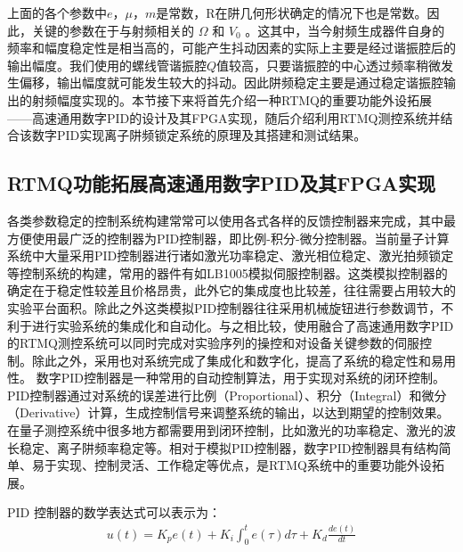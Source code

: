 上面的各个参数中$e$，$\mu$，$m$是常数，R在阱几何形状确定的情况下也是常数。因此，关键的参数在于与射频相关的 $\Omega$ 和 $V_0$ 。这其中，当今射频生成器件自身的频率和幅度稳定性是相当高的，可能产生抖动因素的实际上主要是经过谐振腔后的输出幅度。我们使用的螺线管谐振腔$Q$值较高，只要谐振腔的中心透过频率稍微发生偏移，输出幅度就可能发生较大的抖动。因此阱频稳定主要是通过稳定谐振腔输出的射频幅度实现的。本节接下来将首先介绍一种RTMQ的重要功能外设拓展——高速通用数字PID的设计及其FPGA实现，随后介绍利用RTMQ测控系统并结合该数字PID实现离子阱频锁定系统的原理及其搭建和测试结果。

\subsection[RTMQ功能拓展高速通用数字PID及其FPGA实现]{RTMQ功能拓展高速通用数字PID及其FPGA实现\label{section:digital_pid}}

各类参数稳定的控制系统构建常常可以使用各式各样的反馈控制器来完成，其中最方便使用最广泛的控制器为PID控制器，即比例-积分-微分控制器。当前量子计算系统中大量采用PID控制器进行诸如激光功率稳定、激光相位稳定、激光拍频锁定等控制系统的构建，常用的器件有如LB1005模拟伺服控制器。这类模拟控制器的确定在于稳定性较差且价格昂贵，此外它的集成度也比较差，往往需要占用较大的实验平台面积。除此之外这类模拟PID控制器往往采用机械旋钮进行参数调节，不利于进行实验系统的集成化和自动化。与之相比较，使用融合了高速通用数字PID的RTMQ测控系统可以同时完成对实验序列的操控和对设备关键参数的伺服控制。除此之外，采用也对系统完成了集成化和数字化，提高了系统的稳定性和易用性。
数字PID控制器是一种常用的自动控制算法，用于实现对系统的闭环控制。PID控制器通过对系统的误差进行比例（Proportional）、积分（Integral）和微分（Derivative）计算，生成控制信号来调整系统的输出，以达到期望的控制效果。在量子测控系统中很多地方都需要用到闭环控制，比如激光的功率稳定、激光的波长稳定、离子阱频率稳定等。相对于模拟PID控制器，数字PID控制器具有结构简单、易于实现、控制灵活、工作稳定等优点，是RTMQ系统中的重要功能外设拓展。

PID 控制器的数学表达式可以表示为：
\begin{align}
    u(t)= K_p e(t) + K_i \int_{0}^{t} e(\tau) d\tau + K_d \frac{d e(t)}{dt}
\end{align}


